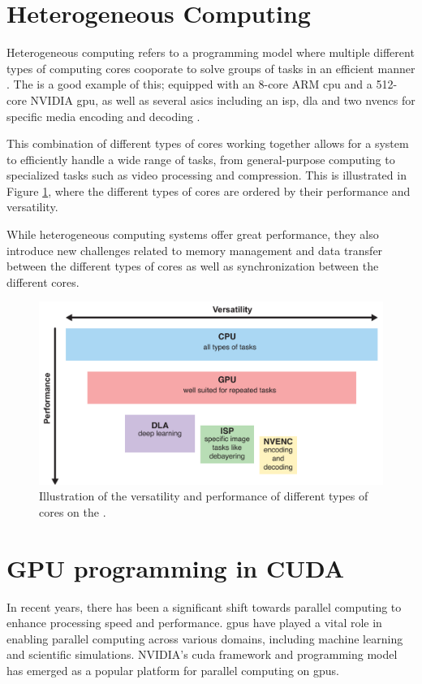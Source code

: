 \section{Heterogeneous Computing}
Heterogeneous computing refers to a programming model where multiple different types of computing cores cooporate to solve groups of tasks in an efficient manner \cite{armWhatHeterogenousCompute}.
The \jx is a good example of this; equipped with an 8-core ARM \gls{cpu} and a 512-core NVIDIA \gls{gpu}, as well as several \glspl{asic} including an \gls{isp}, \gls{dla} and two \glspl{nvenc} for specific media encoding and decoding \cite[9, 8, 23, 15-22]{nvidiaNVIDIAJetsonAGX2019}.

This combination of different types of cores working together allows for a system to efficiently handle a wide range of tasks, from general-purpose computing to specialized tasks such as video processing and compression.
This is illustrated in Figure \ref{fig:jx_hierarchy}, where the different types of cores are ordered by their performance and versatility.

While heterogeneous computing systems offer great performance, they also introduce new challenges related to memory management and data transfer between the different types of cores as well as synchronization between the different cores.

\begin{figure}[H]
    \centering
    \includegraphics[width=.8\textwidth]{figures/PDF/jx_hierarchy.pdf}
    \caption{Illustration of the versatility and performance of different types of cores on the \jx.}
    \label{fig:jx_hierarchy}
\end{figure}


\section{GPU programming in CUDA}
In recent years, there has been a significant shift towards parallel computing to enhance processing speed and performance.
\glspl{gpu} have played a vital role in enabling parallel computing across various domains, including machine learning and scientific simulations.
NVIDIA's \gls{cuda} framework and programming model has emerged as a popular platform for parallel computing on \glspl{gpu}.


